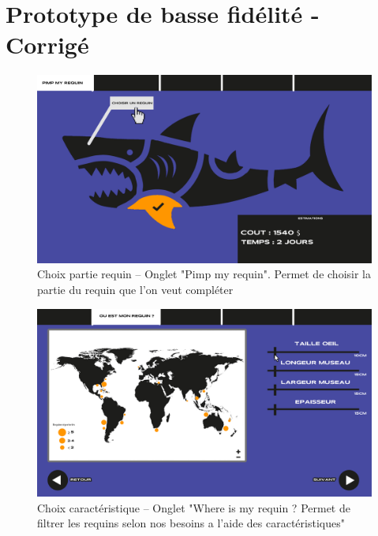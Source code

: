 \documentclass{article}
\begin{document}
\clearpage
\section{Prototype de basse fidélité - Corrigé}

\begin{figure}[!h]
	\centering
	\includegraphics[width=14.4cm]{assets/prototype/basse/onglet1}
	\caption{Choix partie requin – Onglet "Pimp my requin". Permet de choisir la partie du requin que l'on veut compléter}
	\label{onglet1}
\end{figure}

\vspace{0.3cm}

\begin{figure}[!h]
	\centering
	\includegraphics[width=14.4cm]{assets/prototype/basse/onglet2}
	\caption{ Choix caractéristique – Onglet "Where is my requin ? Permet de filtrer les requins selon nos besoins a l'aide des caractéristiques"}
	\label{onglet2}
\end{figure}
\end{document}
